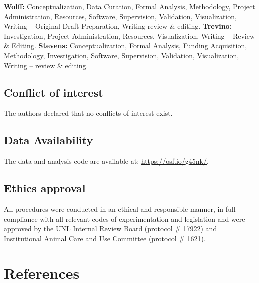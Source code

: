 \documentclass[
  ,doc,floatsintext]{apa6}
\begin{document}
\textbf{Wolff:} Conceptualization, Data Curation, Formal Analysis, Methodology, Project Administration, Resources, Software, Supervision, Validation, Visualization, Writing -- Original Draft Preparation, Writing-review \& editing. \textbf{Trevino:} Investigation, Project Administration, Resources, Visualization, Writing -- Review \& Editing. \textbf{Stevens:} Conceptualization, Formal Analysis, Funding Acquisition, Methodology, Investigation, Software, Supervision, Validation, Visualization, Writing -- review \& editing.

\hypertarget{conflict-of-interest}{%
\subsection{Conflict of interest}\label{conflict-of-interest}}

The authors declared that no conflicts of interest exist.

\hypertarget{data-availability}{%
\subsection{Data Availability}\label{data-availability}}

The data and analysis code are available at: \url{https://osf.io/g45nk/}.

\hypertarget{ethics-approval}{%
\subsection{Ethics approval}\label{ethics-approval}}

All procedures were conducted in an ethical and responsible manner, in full compliance with all relevant codes of experimentation and legislation and were approved by the UNL Internal Review Board (protocol \# 17922) and Institutional Animal Care and Use Committee (protocol \# 1621).

\newpage

\hypertarget{references}{%
\section{References}\label{references}}
\end{document}
